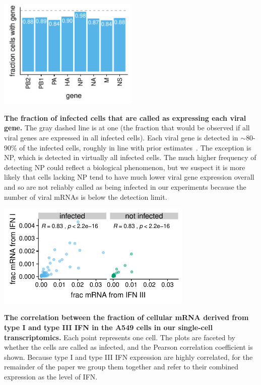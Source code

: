 \documentclass[10pt,letterpaper]{article}
\begin{document}
\begin{suppfig}
\includegraphics[width=0.5\textwidth]{figures/single_cell_figures/p_frac_has_gene.pdf}
\caption{
{\bf The fraction of infected cells that are called as expressing each viral gene.}
The gray dashed line is at one (the fraction that would be observed if all viral genes are expressed in all infected cells).
Each viral gene is detected in $\sim$80-90\% of the infected cells, roughly in line with prior estimates~\cite{brooke2013most, heldt2015single, dou2017analysis, russell2018extreme}.
The exception is NP, which is detected in virtually all infected cells.
The much higher frequency of detecting NP could reflect a biological phenomenon, but we suspect it is more likely that cells lacking NP tend to have much lower viral gene expression overall and so are not reliably called as being infected in our experiments because the number of viral mRNAs is below the detection limit.}
\label{suppfig:frac_has_gene}
\end{suppfig}

\begin{suppfig}
\includegraphics[width=0.7\textwidth]{figures/single_cell_figures/p_ifn_genes_corr.pdf}
\caption{
{\bf The correlation between the fraction of cellular mRNA derived from type I and type III IFN in the A549 cells in our single-cell transcriptomics.}
Each point represents one cell.
The plots are faceted by whether the cells are called as infected, and the Pearson correlation coefficient is shown.
Because type I and type III IFN expression are highly correlated, for the remainder of the paper we group them together and refer to their combined expression as the level of IFN.
}
\label{suppfig:type_I_III_correlation}
\end{suppfig}
\end{document}
